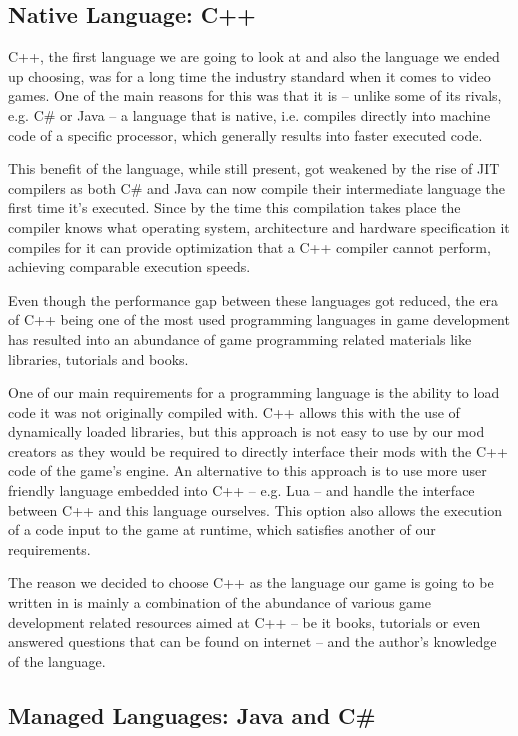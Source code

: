 \subsection{Native Language: C++}

C++, the first language we are going to look at and also the language we ended up choosing, was for a long time the
industry standard when it comes to video games. One of the main reasons for this was that it is -- unlike some of its
rivals, e.g. C\# or Java -- a language that is native, i.e. compiles directly into machine code of a specific processor, 
which generally results into faster executed code.

This benefit of the language, while still present, got weakened by the rise of JIT compilers as both C\# and Java can now
compile their intermediate language the first time it's executed. Since by the time this compilation takes place the
compiler knows what operating system, architecture and hardware specification it compiles for it can provide optimization that
a C++ compiler cannot perform, achieving comparable execution speeds.

Even though the performance gap between these languages got reduced, the era of C++ being one of the most used programming languages
in game development has resulted into an abundance of game programming related materials like libraries, tutorials and books.

One of our main requirements for a programming language is the ability to load code it was not originally compiled with. C++ allows this
with the use of dynamically loaded libraries, but this approach is not easy to use by our mod creators as they would be required to
directly interface their mods with the C++ code of the game's engine. An alternative to this approach is to use more user friendly
language embedded into C++ -- e.g. Lua -- and handle the interface between C++ and this language ourselves. This option also
allows the execution of a code input to the game at runtime, which satisfies another of our requirements.

The reason we decided to choose C++ as the language our game is going to be written in is mainly a combination of the abundance of
various game development related resources aimed at C++ -- be it books, tutorials or even answered questions that can be found
on internet -- and the author's knowledge of the language.

\subsection{Managed Languages: Java and C\#}

